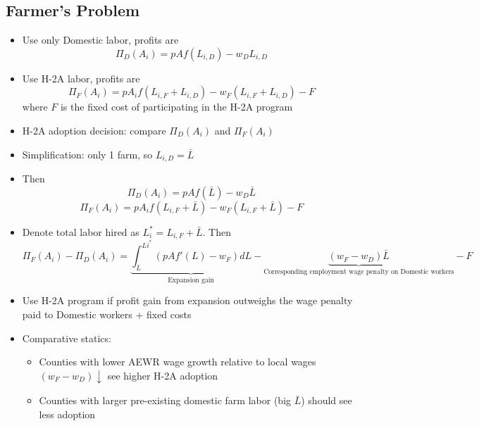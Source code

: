 \documentclass[14pt]{article}
\begin{document}
\subsection{Farmer's Problem}
\begin{itemize}
    \item Use only Domestic labor, profits are
    \[ \Pi_D(A_i) = p A f(L_{i,D}) - w_D L_{i, D} \]
    \item Use H-2A labor, profits are
    \[ \Pi_F(A_i) = p A_i f(L_{i, F} + L_{i, D}) - w_F(L_{i, F} + L_{i, D}) - F \]
    where \(F\) is the fixed cost of participating in the H-2A program
    \item H-2A adoption decision: compare \( \Pi_D(A_i) \) and \( \Pi_F(A_i) \)
    \item Simplification: only 1 farm, so \( L_{i,D} = \bar{L}\)
    \item Then
    \[ \Pi_D (A_i) = p A f(\bar{L}) - w_D \bar{L} \]
    \[ \Pi_F(A_i) = p A_i f(L_{i, F} + \bar{L}) - w_F(L_{i, F} + \bar{L}) - F \]
    \item Denote total labor hired as \(L_{i}^* = L_{i,F} + \bar{L}\). Then
    \[ \Pi_F(A_i) -  \Pi_D (A_i) =  \underbrace{\int_{\bar{L}}^{L{i}^*} \left( p A f'(L) - w_F  \right) dL}_{\text{Expansion gain}} - \underbrace{(w_F - w_D) \bar{L}}_{\text{Corresponding employment wage penalty on Domestic workers}} - F \]
    \item Use H-2A program if profit gain from expansion outweighs the wage penalty paid to Domestic workers + fixed costs
    \item Comparative statics:
    \begin{itemize}
        \item Counties with lower AEWR wage growth relative to local wages \( (w_F - w_D)  \downarrow \) see higher H-2A adoption
        \item Counties with larger pre-existing domestic farm labor (big \( \bar{L} \)) should see less adoption
    \end{itemize}
\end{itemize}

\printbibliography
\end{document}
